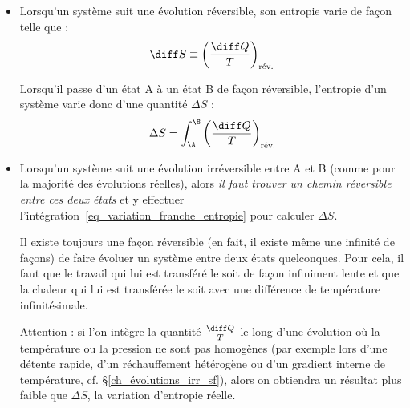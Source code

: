 		\begin{itemize}
			\item Lorsqu’un système suit une évolution réversible, son entropie varie de façon telle que :
				\begin{equation}
					\diff S \equiv  \left( \frac{\diff Q}{T} \right)_\text{rév.}
					\label{def_entropie}
				\end{equation}
				{\small%
				}

				Lorsqu’il passe d’un état A à un état B de façon réversible, l’entropie d’un système varie donc d’une quantité $\Delta S$ :	
				\begin{equation}
					\Delta S = \int_\A^\B \left( \frac{\diff Q}{T} \right)_\text{rév.}
					\label{eq_variation_franche_entropie}
				\end{equation}

			\item Lorsqu’un système suit une évolution irréversible entre A et B (comme pour la majorité des évolutions réelles), alors \emph{il faut trouver un chemin réversible entre ces deux états} et y effectuer l’intégration~\ref{eq_variation_franche_entropie} pour calculer $\Delta S$. 

				Il existe toujours une façon réversible (en fait, il existe même une infinité de façons) de faire évoluer un système entre deux états quelconques. Pour cela, il faut que le travail qui lui est transféré le soit de façon infiniment lente et que la chaleur qui lui est transférée le soit avec une différence de température infinitésimale.
				
				Attention : si l’on intègre la quantité $\frac{\diff Q}{T}$ le long d’une évolution où la température ou la pression ne sont pas homogènes (par exemple lors d’une détente rapide, d’un réchauffement hétérogène ou d’un gradient interne de température, cf. \S\ref{ch_évolutions_irr_sf}), alors on obtiendra un résultat plus faible que $\Delta S$, la variation d’entropie réelle. 
				
			\end{itemize}


